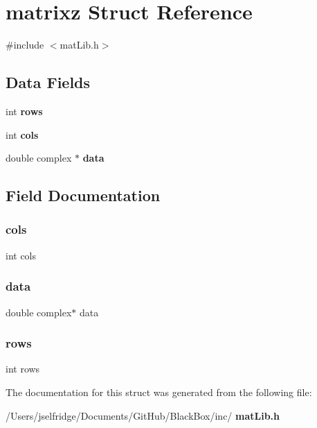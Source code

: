 \section{matrixz Struct Reference}
\label{structmatrixz}


{\ttfamily \#include $<$mat\+Lib.\+h$>$}

\subsection*{Data Fields}
\begin{DoxyCompactItemize}
\item 
int \textbf{ rows}
\item 
int \textbf{ cols}
\item 
double complex $\ast$ \textbf{ data}
\end{DoxyCompactItemize}


\subsection{Field Documentation}
\mbox{\label{structmatrixz_a4407a60bc4387adae24cee658711f2d9}} 
\subsubsection{cols}
{\footnotesize\ttfamily int cols}

\mbox{\label{structmatrixz_add67fd23293f918d1e245e2d617cd751}} 
\subsubsection{data}
{\footnotesize\ttfamily double complex$\ast$ data}

\mbox{\label{structmatrixz_a061459acc9e078fa4699e0e349887215}} 
\subsubsection{rows}
{\footnotesize\ttfamily int rows}



The documentation for this struct was generated from the following file\+:\begin{DoxyCompactItemize}
\item 
/\+Users/jselfridge/\+Documents/\+Git\+Hub/\+Black\+Box/inc/\textbf{ mat\+Lib.\+h}\end{DoxyCompactItemize}
